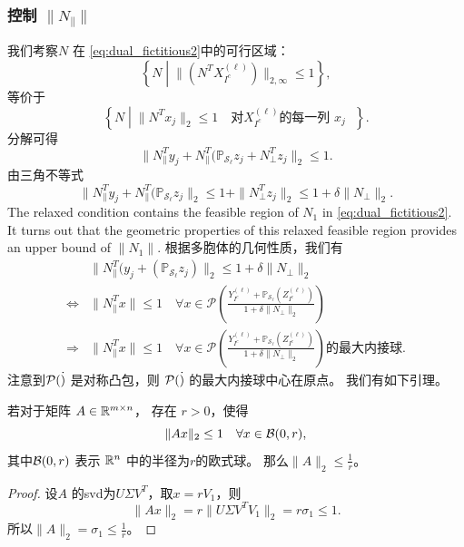\documentclass{ctexart}
\begin{document}
\subsubsection{控制 $\|N_{\parallel}\|$}
我们考察$N$ 在 \eqref{eq:dual_fictitious2}中的可行区域：
$$\left\{N \middle| \|(N^T X^{(\ell)}_{I^c})\|_{2,\infty} \leq 1\right\},$$
等价于
$$\left\{N \middle| \| N^T x_j\|_2 \leq 1 \quad\text{对$X^{(\ell)}_{I^c}$的每一列 $x_j$ }\right\}.$$
分解可得
$$\| N_{\parallel}^T y_j+N_{\parallel}^T (\mathbb{P}_{\mathcal{S}_{\ell}}z_j +
N_{\perp}^T z_j\|_2 \leq 1.$$
由三角不等式
\begin{equation}\label{eq:relax_constraint}
  \| N_{\parallel}^T y_j+N_{\parallel}^T (\mathbb{P}_{\mathcal{S}_{\ell}}z_j \|_2
  \leq 1+\|N_{\perp}^T z_j\|_2 \leq 1+\delta\|N_{\perp}\|_2.
\end{equation}
The relaxed condition contains the feasible region of $N_1$ in \eqref{eq:dual_fictitious2}.
It turns out that the geometric properties of this relaxed feasible region provides an upper bound of $\|N_1\|$.
根据多胞体的几何性质，我们有
\begin{align}
  & \| N_{\parallel}^T (y_j+ (\mathbb{P}_{\mathcal{S}_{\ell}}z_j) \|_2 \leq
  1+\delta\|N_{\perp}\|_2 \nonumber\\
  \Leftrightarrow & \|N_{\parallel}^T x\| \leq 1 \quad \forall x \in \mathcal{P}\left(\frac{Y_{I^c}^{(\ell)}+
  \mathbb{P}_{\mathcal{S}_{\ell}}(Z_{I^c}^{(\ell)})}{1+\delta\|N_{\perp}\|_2}\right)
  \nonumber\\
  \Rightarrow & \|N_{\parallel}^T x\| \leq 1 \quad \forall x \in \mathcal{P}\left(\frac{Y_{I^c}^{(\ell)}+
  \mathbb{P}_{\mathcal{S}_{\ell}}(Z_{I^c}^{(\ell)})}{1+\delta\|N_{\perp}\|_2}\right)
  \text{的最大内接球}.\label{eq:Geometric_dual}
\end{align}
注意到$\mathcal{P}(\dot)$ 是对称凸包，则 $\mathcal{P}(\dot)$ 的最大内接球中心在原点。
我们有如下引理。

\begin{lemma}\label{lemma:circum_inradius}
  若对于矩阵 $A \in \mathbb{R}^{m \times n}$， 存在 $r>0$，使得
  $$\|Ax\|_2 \leq 1 \quad \forall x \in \mathcal{B}(0, r),$$
  其中$\mathcal{B}(0, r)$ 表示 $\mathbb{R}^n$ 中的半径为$r$的欧式球。
  那么$\|A\|_2 \leq \frac{1}{r}$。
\end{lemma}
\begin{proof}
  设$A$ 的svd为$U\Sigma V^T$，取$x=rV_1$，则
  $$\|Ax\|_2 = r \|U \Sigma V^T V_1\|_2 = r \sigma_1 \leq 1.$$
  所以$\|A\|_2 = \sigma_1 \leq \frac{1}{r}$。
\end{proof}
\end{document}
